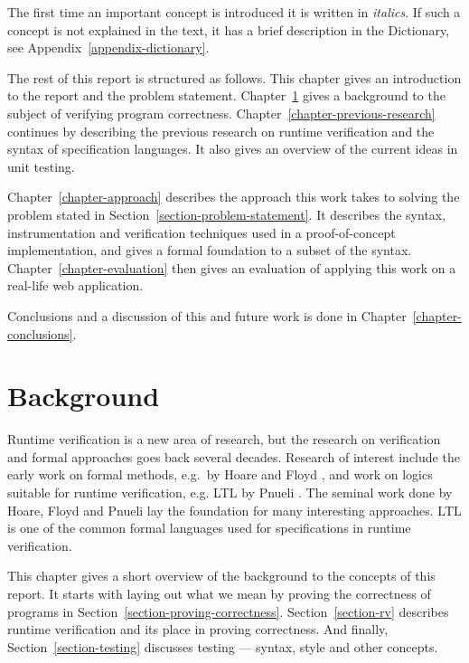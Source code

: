 \documentclass[a4paper,11pt]{kth-mag}
\begin{document}
The first time an important concept is introduced it is written in
\textit{italics}. If such a concept is not explained in the text, it has a
brief description in the Dictionary, see Appendix~\ref{appendix-dictionary}.

The rest of this report is structured as follows. This chapter gives an
introduction to the report and the problem statement.
Chapter~\ref{chapter-background} gives a background to the subject of verifying
program correctness. Chapter~\ref{chapter-previous-research} continues by
describing the previous research on runtime verification and the syntax of
specification languages. It also gives an overview of the current ideas in unit
testing.

Chapter~\ref{chapter-approach} describes the approach this work takes to
solving the problem stated in Section~\ref{section-problem-statement}. It
describes the syntax, instrumentation and verification techniques used in a
proof-of-concept implementation, and gives a formal foundation to a subset of
the syntax. Chapter~\ref{chapter-evaluation} then gives an evaluation of
applying this work on a real-life web application.

Conclusions and a discussion of this and future work is done in
Chapter~\ref{chapter-conclusions}.






\pagestyle{newchap}
\chapter{Background} \label{chapter-background}

Runtime verification is a new area of research, but the research on
verification and formal approaches goes back several decades. Research of
interest include the early work on formal methods, e.g.\ by Hoare
\cite{hoare69} and Floyd \cite{floyd67}, and work on logics suitable for
runtime verification, e.g. LTL by Pnueli \cite{pnueli77}. The seminal work done
by Hoare, Floyd and Pnueli lay the foundation for many interesting approaches.
LTL is one of the common formal languages used for specifications in runtime
verification.

This chapter gives a short overview of the background to the concepts of this
report. It starts with laying out what we mean by proving the correctness of
programs in Section~\ref{section-proving-correctness}. Section~\ref{section-rv}
describes runtime verification and its place in proving correctness. And
finally, Section~\ref{section-testing} discusses testing --- syntax, style and
other concepts.
\end{document}
